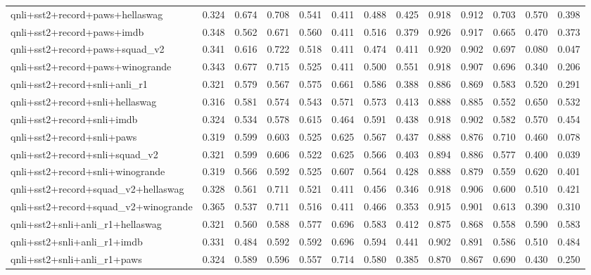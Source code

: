 \begin{table}[t]
\begin{tabular}{lrrrrrrrrrrrr}
    qnli+sst2+record+paws+hellaswag & 0.324 & 0.674 & 0.708 & 0.541 & 0.411 & 0.488 & 0.425 & 0.918 & 0.912 & 0.703 & 0.570 & 0.398 \\
    qnli+sst2+record+paws+imdb & 0.348 & 0.562 & 0.671 & 0.560 & 0.411 & 0.516 & 0.379 & 0.926 & 0.917 & 0.665 & 0.470 & 0.373 \\
    qnli+sst2+record+paws+squad\_v2 & 0.341 & 0.616 & 0.722 & 0.518 & 0.411 & 0.474 & 0.411 & 0.920 & 0.902 & 0.697 & 0.080 & 0.047 \\
    qnli+sst2+record+paws+winogrande & 0.343 & 0.677 & 0.715 & 0.525 & 0.411 & 0.500 & 0.551 & 0.918 & 0.907 & 0.696 & 0.340 & 0.206 \\
    qnli+sst2+record+snli+anli\_r1 & 0.321 & 0.579 & 0.567 & 0.575 & 0.661 & 0.586 & 0.388 & 0.886 & 0.869 & 0.583 & 0.520 & 0.291 \\
    qnli+sst2+record+snli+hellaswag & 0.316 & 0.581 & 0.574 & 0.543 & 0.571 & 0.573 & 0.413 & 0.888 & 0.885 & 0.552 & 0.650 & 0.532 \\
    qnli+sst2+record+snli+imdb & 0.324 & 0.534 & 0.578 & 0.615 & 0.464 & 0.591 & 0.438 & 0.918 & 0.902 & 0.582 & 0.570 & 0.454 \\
    qnli+sst2+record+snli+paws & 0.319 & 0.599 & 0.603 & 0.525 & 0.625 & 0.567 & 0.437 & 0.888 & 0.876 & 0.710 & 0.460 & 0.078 \\
    qnli+sst2+record+snli+squad\_v2 & 0.321 & 0.599 & 0.606 & 0.522 & 0.625 & 0.566 & 0.403 & 0.894 & 0.886 & 0.577 & 0.400 & 0.039 \\
    qnli+sst2+record+snli+winogrande & 0.319 & 0.566 & 0.592 & 0.525 & 0.607 & 0.564 & 0.428 & 0.888 & 0.879 & 0.559 & 0.620 & 0.401 \\
    qnli+sst2+record+squad\_v2+hellaswag & 0.328 & 0.561 & 0.711 & 0.521 & 0.411 & 0.456 & 0.346 & 0.918 & 0.906 & 0.600 & 0.510 & 0.421 \\
    qnli+sst2+record+squad\_v2+winogrande & 0.365 & 0.537 & 0.711 & 0.516 & 0.411 & 0.466 & 0.353 & 0.915 & 0.901 & 0.613 & 0.390 & 0.310 \\
    qnli+sst2+snli+anli\_r1+hellaswag & 0.321 & 0.560 & 0.588 & 0.577 & 0.696 & 0.583 & 0.412 & 0.875 & 0.868 & 0.558 & 0.590 & 0.583 \\
    qnli+sst2+snli+anli\_r1+imdb & 0.331 & 0.484 & 0.592 & 0.592 & 0.696 & 0.594 & 0.441 & 0.902 & 0.891 & 0.586 & 0.510 & 0.484 \\
    qnli+sst2+snli+anli\_r1+paws & 0.324 & 0.589 & 0.596 & 0.557 & 0.714 & 0.580 & 0.385 & 0.870 & 0.867 & 0.690 & 0.430 & 0.250 \\

\end{tabular}
\end{table}
